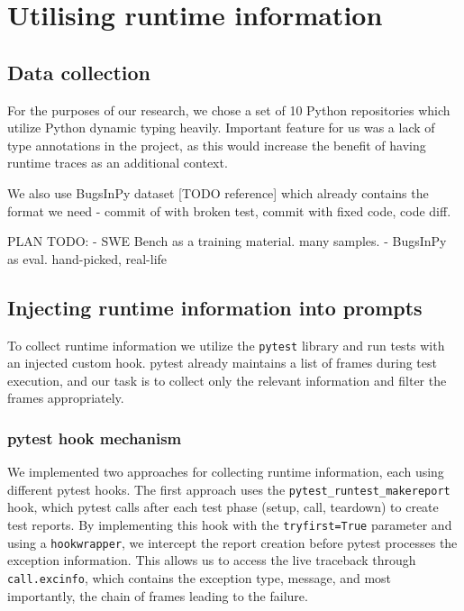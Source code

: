 \chapter{Utilising runtime information}
\label{ch:methodology}

\section{Data collection}

For the purposes of our research, we chose a set of 10 Python repositories which utilize Python dynamic typing heavily. Important feature for us was a lack of type annotations in the project, as this would increase the benefit of having runtime traces as an additional context. 

We also use BugsInPy dataset [TODO reference] which already contains the format we need - commit of with broken test, commit with fixed code, code diff.

PLAN TODO:
- SWE Bench as a training material. many samples.
- BugsInPy as eval. hand-picked, real-life

\section{Injecting runtime information into prompts}

To collect runtime information we utilize the \texttt{pytest} library and run tests with an injected custom hook. pytest already maintains a list of frames during test execution, and our task is to collect only the relevant information and filter the frames appropriately.

\subsection{pytest hook mechanism}

We implemented two approaches for collecting runtime information, each using different pytest hooks. The first approach uses the \texttt{pytest\_runtest\_makereport} hook, which pytest calls after each test phase (setup, call, teardown) to create test reports. By implementing this hook with the \texttt{tryfirst=True} parameter and using a \texttt{hookwrapper}, we intercept the report creation before pytest processes the exception information. This allows us to access the live traceback through \texttt{call.excinfo}, which contains the exception type, message, and most importantly, the chain of frames leading to the failure.

